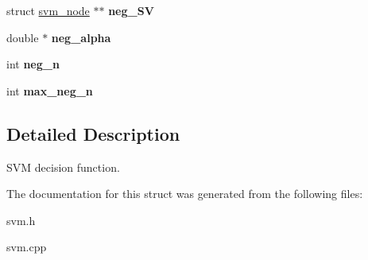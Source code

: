 \begin{DoxyCompactItemize}
\item 
\hypertarget{structsvm__model_a4ce40c17aa0e5b0ecf89c75e4295305f}{struct \hyperlink{structsvm__node}{svm\+\_\+node} $\ast$$\ast$ {\bfseries neg\+\_\+\+S\+V}}\label{structsvm__model_a4ce40c17aa0e5b0ecf89c75e4295305f}

\item 
\hypertarget{structsvm__model_a9c5d38de8b126bca8f4adf8b5add2e53}{double $\ast$ {\bfseries neg\+\_\+alpha}}\label{structsvm__model_a9c5d38de8b126bca8f4adf8b5add2e53}

\item 
\hypertarget{structsvm__model_a4edf82ef45dc8a1859547ab553bd142a}{int {\bfseries neg\+\_\+n}}\label{structsvm__model_a4edf82ef45dc8a1859547ab553bd142a}

\item 
\hypertarget{structsvm__model_ada63b0010ac5d785dd0ba19277ab2396}{int {\bfseries max\+\_\+neg\+\_\+n}}\label{structsvm__model_ada63b0010ac5d785dd0ba19277ab2396}

\end{DoxyCompactItemize}


\subsection{Detailed Description}
S\+V\+M decision function. 

The documentation for this struct was generated from the following files\+:\begin{DoxyCompactItemize}
\item 
svm.\+h\item 
svm.\+cpp\end{DoxyCompactItemize}

